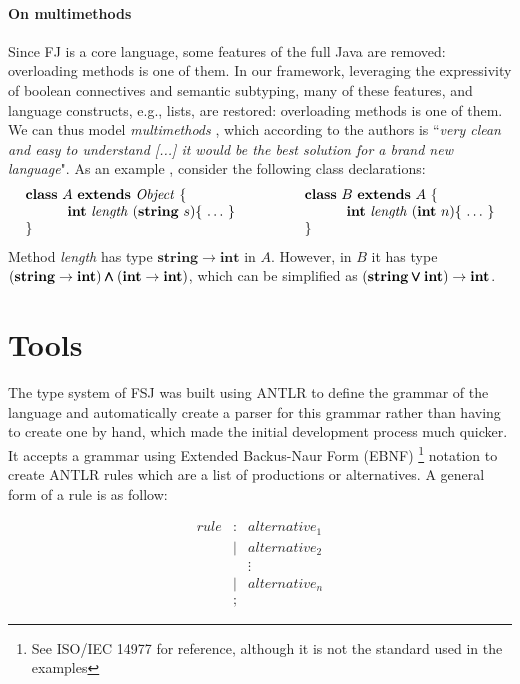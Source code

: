 \documentclass{l4proj}
\begin{document}
\paragraph{On multimethods}
Since FJ is a core language, some features of the full Java are removed: overloading methods is one of them.
In our framework, leveraging the expressivity of boolean connectives and semantic subtyping, many of these features, and language constructs, e.g., lists, are restored: overloading methods is one of them. We can thus model \emph{multimethods} \citep{BC97}, which according to the authors is ``\emph{very clean and easy to understand [...] it would be the best solution for a brand new language}".
As an example \citet{Dardha2013,Dardha2017}, consider the following class declarations:
$$
    \begin{array}{ll}
        \syndecl{A}{\mathit{Object}} {
         &
            \qquad
            \syndecl{B}{A} {
                \\
                \qquad\quad \mathbf{int}\ \mathit{length}\ (\mathbf{string}\ s)\{\ \ldots\ \}\qquad
         &
                \qquad\qquad\quad \mathbf{int}\ \mathit{length}\ (\mathbf{int}\ n)\{\ \ldots\ \}
                \\
            }
         &
            \qquad }
    \end{array}
$$
Method {\it length} has type $\mathbf{string} \rightarrow \mathbf{int}$ in $A$. However, in $B$ it has type $(\mathbf{string} \rightarrow \mathbf{int}) \pmb{\wedge} (\mathbf{int} \rightarrow \mathbf{int})$,
which can be simplified as $(\mathbf{string} \pmb{\vee} \mathbf{int}) \rightarrow \mathbf{int}$.


\section{Tools}

The type system of FSJ was built using ANTLR \citep{parr2013} to define the grammar of the language and automatically create a parser for this grammar rather than having to create one by hand, which made the initial development process much quicker.
It accepts a grammar using Extended Backus-Naur Form (EBNF) \footnote{See ISO/IEC 14977 for reference, although it is not the standard used in the examples} notation to create ANTLR rules which are a list of productions or alternatives.
A general form of a rule is as follow:

$$
    \begin{array}{llll}
        rule & : & alternative_{1}
        \\
             & | & alternative_{2}
        \\
             &   & \vdots
        \\
             & | & alternative_{n}
        \\
             & ; &
    \end{array}
$$
\end{document}
